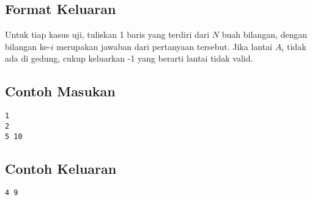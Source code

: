 \documentclass{article}
\begin{document}
\subsection*{Format Keluaran}

Untuk tiap kasus uji, tuliskan 1 baris yang terdiri dari $N$ buah bilangan, dengan bilangan ke-$i$ merupakan jawaban dari pertanyaan tersebut. Jika lantai $A_i$ tidak ada di gedung, cukup keluarkan -1 yang berarti lantai tidak valid.
\\

\begin{multicols}{2}
\subsection*{Contoh Masukan}
\begin{lstlisting}
1
2
5 10
\end{lstlisting}
\columnbreak
\subsection*{Contoh Keluaran}
\begin{lstlisting}
4 9
\end{lstlisting}
\vfill
\null
\end{multicols}

\pagebreak
\end{document}
